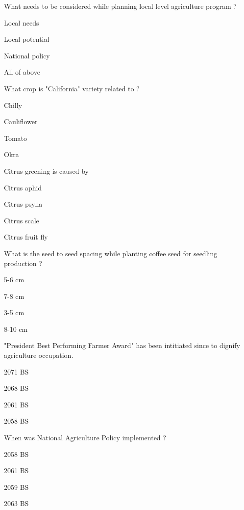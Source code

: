 \begin{questions}
\question What needs to be considered while planning local level agriculture program ?
\begin{items}
\item Local needs
\item Local potential
\item National policy
\item* All of above
\end{items}

\question What crop is "California" variety related to ?
\begin{items}
\item* Chilly
\item Cauliflower
\item Tomato
\item Okra
\end{items}

\question Citrus greening is caused by
\begin{items}
\item Citrus aphid
\item* Citrus psylla
\item Citrus scale
\item Citrus fruit fly
\end{items}

\question What is the seed to seed spacing while planting coffee seed for seedling production ?
\begin{items}
\item 5-6 cm
\item 7-8 cm
\item* 3-5 cm
\item 8-10 cm
\end{items}

\question "President Best Performing Farmer Award" has been intitiated since \fillin[][3cm] to dignify agriculture occupation.
\begin{items}
\item* 2071 BS
\item 2068 BS
\item 2061 BS
\item 2058 BS
\end{items}

\question When was National Agriculture Policy implemented ?
\begin{items}
\item 2058 BS
\item* 2061 BS
\item 2059 BS
\item 2063 BS
\end{items}


\end{questions}
